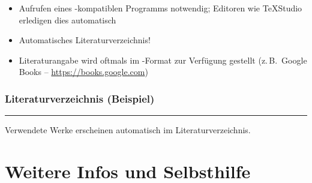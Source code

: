\begin{frame}[<+->]
	\begin{itemize}
		\item Aufrufen eines -kompatiblen Programms notwendig; Editoren wie TeXStudio erledigen dies automatisch
		\item Automatisches Literaturverzeichnis!
		\item Literaturangabe wird oftmals im -Format zur Verfügung gestellt (z.\,B.\ Google Books – \url{https://books.google.com})
	\end{itemize}
	
\end{frame}

\begin{frame}[<+->]
	\frametitle{Literaturverzeichnis (Beispiel)}
	\nocite{sakurai2014modern}
	\printbibliography
	
	\hrule\bigskip
	
	Verwendete Werke erscheinen automatisch im Literaturverzeichnis.
\end{frame}

\section{Weitere Infos und Selbsthilfe}

